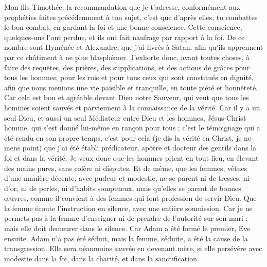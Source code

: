 \begin{multicols}{2}
Mon fils Timothée, la recommandation que je t’adresse, conformément aux prophéties faites précédemment à ton sujet, c’est que d’après elles, tu combattes le bon combat,
en gardant la foi et une bonne conscience. Cette conscience, quelques-uns l’ont perdue, et ils ont fait naufrage par rapport à la foi.
De ce nombre sont Hyménée et Alexandre, que j'ai livrés à Satan, afin qu'ils apprennent par ce châtiment à ne plus blasphémer.
\VerseOne{}J'exhorte donc, avant toutes choses, à faire des requêtes, des prières, des supplications, et des actions de grâces pour tous les hommes,
pour les rois et pour tous ceux qui sont constitués en dignité, afin que nous menions une vie paisible et tranquille, en toute piété et honnêteté.
Car cela est bon et agréable devant Dieu notre Sauveur,
qui veut que tous les hommes soient sauvés et parviennent à la connaissance de la vérité.
Car il y a un seul Dieu, et aussi un seul Médiateur entre Dieu et les hommes, Jésus-Christ homme,
qui s'est donné lui-même en rançon pour tous ; c’est le témoignage qui a été rendu en son propre temps,
c'est pour cela (je dis la vérité en Christ, je ne mens point) que j'ai été établi prédicateur, apôtre et docteur des gentils dans la foi et dans la vérité.
Je veux donc que les hommes prient en tout lieu, en élevant des mains pures, sans colère ni disputes.
Et de même, que les femmes, vêtues d’une manière décente, avec pudeur et modestie, ne se parent ni de tresses, ni d’or, ni de perles, ni d’habits somptueux,
mais qu'elles se parent de bonnes œuvres, comme il convient à des femmes qui font profession de servir Dieu.
Que la femme écoute l’instruction en silence, avec une entière soumission.
Car je ne permets pas à la femme d'enseigner ni de prendre de l’autorité sur son mari ; mais elle doit demeurer dans le silence.
Car Adam a été formé le premier, Eve ensuite.
Adam n’a pas été séduit, mais la femme, séduite, a été la cause de la transgression.
Elle sera néanmoins sauvée en devenant mère, si elle persévère avec modestie dans la foi, dans la charité, et dans la sanctification.

\end{multicols}
